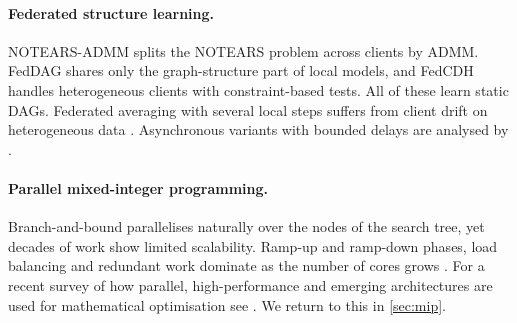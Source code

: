 \paragraph{Federated structure learning.}
NOTEARS-ADMM \citep{ng2022federated} splits the NOTEARS problem across clients by ADMM.
FedDAG \citep{gao2023feddag} shares only the graph-structure part of local models, and FedCDH
\citep{li2024fedcdh} handles heterogeneous clients with constraint-based tests. All of these
learn static DAGs. Federated averaging \citep{mcmahan2017fedavg} with several local steps
suffers from client drift on heterogeneous data \citep{karimireddy2020scaffold}.
Asynchronous variants with bounded delays are analysed by \citet{lian2015async}.

\paragraph{Parallel mixed-integer programming.}
Branch-and-bound parallelises naturally over the nodes of the search tree, yet decades of
work show limited scalability. Ramp-up and ramp-down phases, load balancing and redundant
work dominate as the number of cores grows
\citep{shinano2010parascip,koch2012million}. For a recent survey of how parallel,
high-performance and emerging architectures are used for mathematical optimisation see
\citet{bernalneira2024survey}. We return to this in \cref{sec:mip}.
